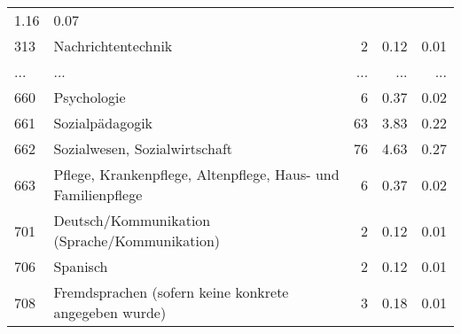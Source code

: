 \begin{longtable}{lXrrr}
          \num[round-mode=places,round-precision=2]{1.16} &
          \num[round-mode=places,round-precision=2]{0.07} \\
        313 & \multicolumn{1}{X}{Nachrichtentechnik} & %
          \num{2} &
          \num[round-mode=places,round-precision=2]{0.12} &
          \num[round-mode=places,round-precision=2]{0.01} \\
       ... & ... & ... & ... & ... \\
        660 & \multicolumn{1}{X}{Psychologie} & %
          \num{6} &
          \num[round-mode=places,round-precision=2]{0.37} &
          \num[round-mode=places,round-precision=2]{0.02} \\

        661 & \multicolumn{1}{X}{Sozialpädagogik} & %
          \num{63} &
          \num[round-mode=places,round-precision=2]{3.83} &
          \num[round-mode=places,round-precision=2]{0.22} \\

        662 & \multicolumn{1}{X}{Sozialwesen, Sozialwirtschaft} & %
          \num{76} &
          \num[round-mode=places,round-precision=2]{4.63} &
          \num[round-mode=places,round-precision=2]{0.27} \\

        663 & \multicolumn{1}{X}{Pflege, Krankenpflege, Altenpflege, Haus- und Familienpflege} & %
          \num{6} &
          \num[round-mode=places,round-precision=2]{0.37} &
          \num[round-mode=places,round-precision=2]{0.02} \\

        701 & \multicolumn{1}{X}{Deutsch/Kommunikation (Sprache/Kommunikation)} & %
          \num{2} &
          \num[round-mode=places,round-precision=2]{0.12} &
          \num[round-mode=places,round-precision=2]{0.01} \\

        706 & \multicolumn{1}{X}{Spanisch} & %
          \num{2} &
          \num[round-mode=places,round-precision=2]{0.12} &
          \num[round-mode=places,round-precision=2]{0.01} \\

        708 & \multicolumn{1}{X}{Fremdsprachen (sofern keine konkrete angegeben wurde)} & %
          \num{3} &
          \num[round-mode=places,round-precision=2]{0.18} &
          \num[round-mode=places,round-precision=2]{0.01} \\


\end{longtable}
